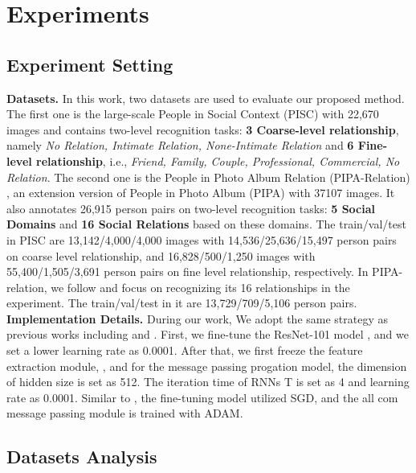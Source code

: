 \documentclass{article}
\begin{document}
\section{Experiments}

\subsection{Experiment Setting}

{\bf Datasets.} In this work, two datasets are used to evaluate our proposed method. The first one is the large-scale People in Social Context (PISC) \cite{DBLP:conf/iccv/LiWZK17} with 22,670 images and contains two-level recognition tasks: {\bf 3 Coarse-level relationship}, namely {\it No Relation, Intimate Relation, None-Intimate Relation} and {\bf 6 Fine-level relationship}, i.e., {\it Friend, Family, Couple, Professional, Commercial, No Relation}. The second one is the People in Photo Album Relation (PIPA-Relation) \cite{DBLP:conf/cvpr/SunSF17}, an extension version of People in Photo Album (PIPA) \cite{DBLP:conf/cvpr/ZhangPTFB15} with 37107 images. It also annotates 26,915 person pairs on two-level recognition tasks: {\bf 5 Social Domains} and {\bf 16 Social Relations} based on these domains. The train/val/test in PISC are 13,142/4,000/4,000 images with 14,536/25,636/15,497 person pairs on coarse level relationship, and 16,828/500/1,250 images with 55,400/1,505/3,691 person pairs on fine level relationship, respectively. In PIPA-relation, we follow \cite{DBLP:conf/ijcai/WangCRYCL18} and focus on recognizing its 16 relationships in the experiment. The train/val/test in it are 13,729/709/5,106 person pairs. \\
{\bf Implementation Details.} During our work, We adopt the same strategy as previous works including \cite{DBLP:conf/iccv/LiWZK17} and \cite{DBLP:conf/ijcai/WangCRYCL18}. First, we fine-tune the ResNet-101 model \cite{DBLP:conf/cvpr/HeZRS16} , and we set a lower learning rate as 0.0001. After that, we first freeze the feature extraction module, 
, and for the message passing progation model, the dimension of hidden size is set as 512. The iteration time of RNNs T is set as 4 and learning rate as 0.0001. Similar to \cite{DBLP:conf/ijcai/WangCRYCL18}, the fine-tuning model utilized SGD, and the all com message passing module is trained with ADAM.

\subsection{Datasets Analysis}\label{section:dataset_anaysis}
\end{document}

